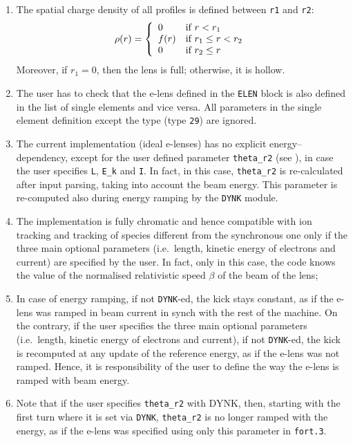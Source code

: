 \begin{enumerate}
\item The spatial charge density of all profiles is defined between \texttt{r1} and \texttt{r2}:
\begin{equation}
  \rho(r)=\left\{
    \begin{array}{ll}
        0 & \mbox{if $r < r_1$} \\
        f(r) & \mbox{if $r_1 \le r < r_2$} \\
        0 & \mbox{if $r_2 \le r$} \\
    \end{array}
    \right. \\
\end{equation}
Moreover, if $r_1=0$, then the lens is full; otherwise, it is hollow.

\item The user has to check that the e-lens defined in the \texttt{ELEN} block is also defined in the list of single elements and vice versa.
  All parameters in the single element definition except the type (type \texttt{29}) are ignored.
\item The current implementation (ideal e-lenses) has no explicit energy--dependency, except for the user defined parameter \texttt{theta\_r2} (see \cite{sixphys}), in case the user specifies \texttt{L}, \texttt{E\_k} and \texttt{I}.
  In fact, in this case, \texttt{theta\_r2} is re-calculated after input parsing, taking into account the beam energy.
  This parameter is re-computed also during energy ramping by the \texttt{DYNK} module.
\item The implementation is fully chromatic and hence compatible with ion tracking and tracking of species different from the synchronous one only if the three main optional parameters (i.e.\ length, kinetic energy of electrons and current) are specified by the user.
  In fact, only in this case, the code knows the value of the normalised relativistic speed $\beta$ of the beam of the lens;
\item In case of energy ramping, if not \texttt{DYNK}-ed, the kick stays constant, as if the e-lens was ramped in beam current in synch with the rest of the machine.
  On the contrary, if the user specifies the three main optional parameters (i.e.~length, kinetic energy of electrons and current), if not \texttt{DYNK}-ed, the kick is recomputed at any update of the reference energy, as if the e-lens was not ramped.
  Hence, it is responsibility of the user to define the way the e-lens is ramped with beam energy.
\item Note that if the user specifies \texttt{theta\_r2} with DYNK, then, starting with the first turn where it is set via \texttt{DYNK}, \texttt{theta\_r2} is no longer ramped with the energy, as if the e-lens was specified using only this parameter in \texttt{fort.3}.

\end{enumerate}

